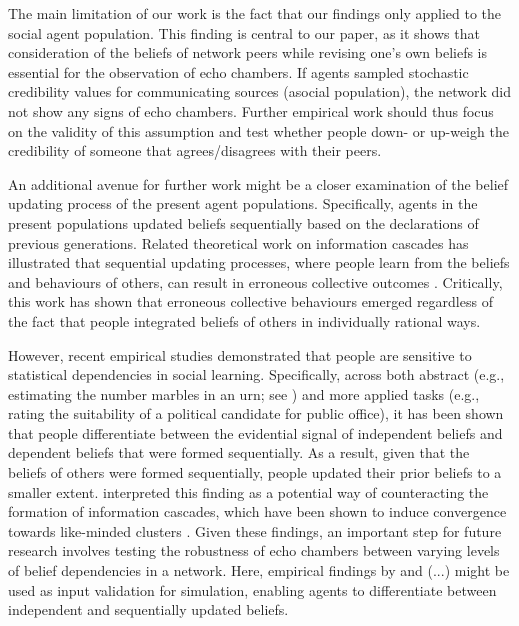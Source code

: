 \documentclass[doc,floatsintext]{apa6}
\begin{document}
The main limitation of our work is the fact that our findings only applied to the social agent population. This finding is central to our paper, as it shows that consideration of the beliefs of network peers while revising one's own beliefs is essential for the observation of echo chambers. If agents sampled stochastic credibility values for communicating sources (asocial population), the network did not show any signs of echo chambers. Further empirical work should thus focus on the validity of this assumption and test whether people down- or up-weigh the credibility of someone that agrees/disagrees with their peers. 

An additional avenue for further work might be a closer examination of the belief updating process of the present agent populations. Specifically, agents in the present populations updated beliefs sequentially based on the declarations of previous generations. Related theoretical work on information cascades has illustrated that sequential updating processes, where people learn from the beliefs and behaviours of others, can result in erroneous collective outcomes \citep{bikhchandani1992theory}. Critically, this work has shown that erroneous collective behaviours emerged regardless of the fact that people integrated beliefs of others in individually rational ways. 

However, recent empirical studies demonstrated that people are sensitive to statistical dependencies in social learning. Specifically, across both abstract (e.g., estimating the number marbles in an urn; see \citet{whalen2018sensitivity}) and more applied tasks (e.g., rating the suitability of a political candidate for public office), it has been shown that people differentiate between the evidential signal of independent beliefs and dependent beliefs that were formed sequentially. As a result, given that the beliefs of others were formed sequentially, people updated their prior beliefs to a smaller extent. \cite{whalen2018sensitivity} interpreted this finding as a potential way of counteracting the formation of information cascades, which have been shown to induce convergence towards like-minded clusters \citep{bikhchandani1998learning}. Given these findings, an important step for future research involves testing the robustness of echo chambers between varying levels of belief dependencies in a network. Here, empirical findings by \citep{whalen2018sensitivity} and (...) might be used as input validation for simulation, enabling agents to differentiate between independent and sequentially updated beliefs. 
\end{document}
